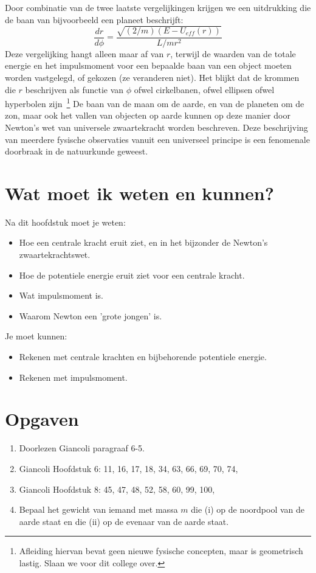 Door combinatie van de twee laatste vergelijkingen krijgen we een uitdrukking die de baan van bijvoorbeeld
een planeet  beschrijft:
\begin{equation}
\frac{d r}{d\phi} = \frac{\sqrt{(2/m)(E-U_{eff}(r))}}{L/mr^2}
\end{equation}
Deze vergelijking hangt alleen maar af van $r$, terwijl de waarden van de totale energie en het impulsmoment
voor een bepaalde baan van een object moeten worden vastgelegd, of gekozen (ze veranderen niet). Het blijkt
dat de krommen die $r$ beschrijven als functie van $\phi$ ofwel cirkelbanen, ofwel ellipsen ofwel hyperbolen 
zijn~\footnote{Afleiding hiervan bevat geen nieuwe fysische concepten, maar is geometrisch lastig. Slaan we voor dit
college over.} 
De baan van de maan om de aarde, en van de planeten om de zon, maar ook het vallen van objecten op
aarde kunnen op deze manier door Newton's wet van universele zwaartekracht worden beschreven. Deze beschrijving
van meerdere fysische observaties vanuit een universeel principe is een fenomenale doorbraak in de natuurkunde 
geweest.

\section{Wat moet ik weten en kunnen?}

Na dit hoofdstuk moet je weten:
\begin{itemize}
\item Hoe een centrale kracht eruit ziet, en in het bijzonder de Newton's zwaartekrachtswet.
\item Hoe de potentiele energie eruit ziet voor een centrale kracht. 
\item Wat impulsmoment is.
\item Waarom Newton een 'grote jongen' is.
\end{itemize}
Je moet kunnen:
\begin{itemize}
\item Rekenen met centrale krachten en bijbehorende potentiele energie.
\item Rekenen met impulsmoment.
\end{itemize}

\section{Opgaven}

\begin{enumerate}
\item Doorlezen Giancoli paragraaf 6-5.
\item Giancoli Hoofdstuk 6: 11, 16, 17, 18, 34, 63, 66, 69, 70, 74, 
\item Giancoli Hoofdstuk 8: 45, 47, 48, 52, 58, 60, 99, 100,  
\item Bepaal het gewicht van iemand met massa $m$ die (i) op de noordpool van de aarde staat en die (ii) op
de evenaar van de aarde staat.
\end{enumerate}

